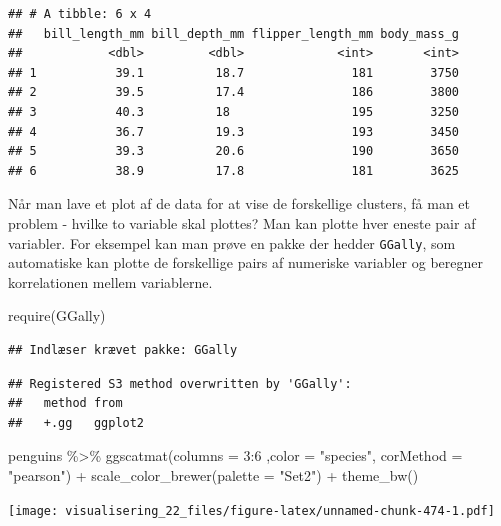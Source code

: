 \documentclass[
]{book}
\newenvironment{Shaded}{\begin{snugshade}}{\end{snugshade}}
\newcommand{\AttributeTok}[1]{\textcolor[rgb]{0.77,0.63,0.00}{#1}}
\newcommand{\DecValTok}[1]{\textcolor[rgb]{0.00,0.00,0.81}{#1}}
\newcommand{\FunctionTok}[1]{\textcolor[rgb]{0.00,0.00,0.00}{#1}}
\newcommand{\NormalTok}[1]{#1}
\newcommand{\SpecialCharTok}[1]{\textcolor[rgb]{0.00,0.00,0.00}{#1}}
\newcommand{\StringTok}[1]{\textcolor[rgb]{0.31,0.60,0.02}{#1}}
\begin{document}
\begin{verbatim}
## # A tibble: 6 x 4
##   bill_length_mm bill_depth_mm flipper_length_mm body_mass_g
##            <dbl>         <dbl>             <int>       <int>
## 1           39.1          18.7               181        3750
## 2           39.5          17.4               186        3800
## 3           40.3          18                 195        3250
## 4           36.7          19.3               193        3450
## 5           39.3          20.6               190        3650
## 6           38.9          17.8               181        3625
\end{verbatim}

Når man lave et plot af de data for at vise de forskellige clusters, få man et problem - hvilke to variable skal plottes? Man kan plotte hver eneste pair af variabler. For eksempel kan man prøve en pakke der hedder \texttt{GGally}, som automatiske kan plotte de forskellige pairs af numeriske variabler og beregner korrelationen mellem variablerne.

\begin{Shaded}
\begin{Highlighting}[]
\FunctionTok{require}\NormalTok{(GGally)}
\end{Highlighting}
\end{Shaded}

\begin{verbatim}
## Indlæser krævet pakke: GGally
\end{verbatim}

\begin{verbatim}
## Registered S3 method overwritten by 'GGally':
##   method from   
##   +.gg   ggplot2
\end{verbatim}

\begin{Shaded}
\begin{Highlighting}[]
\NormalTok{penguins }\SpecialCharTok{\%\textgreater{}\%} 
  \FunctionTok{ggscatmat}\NormalTok{(}\AttributeTok{columns =} \DecValTok{3}\SpecialCharTok{:}\DecValTok{6}\NormalTok{ ,}\AttributeTok{color =} \StringTok{"species"}\NormalTok{, }\AttributeTok{corMethod =} \StringTok{"pearson"}\NormalTok{) }\SpecialCharTok{+} 
  \FunctionTok{scale\_color\_brewer}\NormalTok{(}\AttributeTok{palette =} \StringTok{"Set2"}\NormalTok{) }\SpecialCharTok{+}
  \FunctionTok{theme\_bw}\NormalTok{()}
\end{Highlighting}
\end{Shaded}

\texttt{[image: visualisering\_22\_files/figure-latex/unnamed-chunk-474-1.pdf]}
\end{document}
